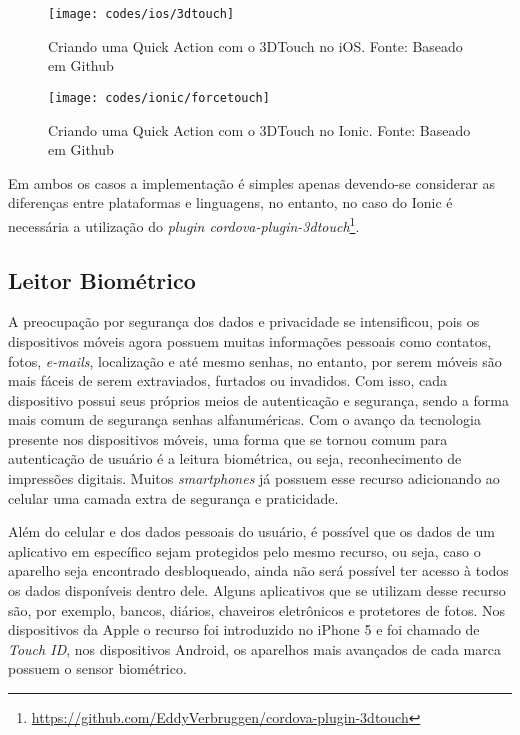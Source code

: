\begin{figure}[H]
	\centering
	\texttt{[image: codes/ios/3dtouch]}
	\caption[Criando uma Quick Action com o 3DTouch no iOS.]{Criando uma Quick Action com o 3DTouch no iOS. Fonte: Baseado em Github\protect\footnotemark}
	\label{fig:3dtouch-ios}
\end{figure}
\begin{figure}[H]
	\centering
	\texttt{[image: codes/ionic/forcetouch]}
	\caption[Criando uma Quick Action com o 3DTouch no Ionic]{Criando uma Quick Action com o 3DTouch no Ionic. Fonte: Baseado em Github\protect\footnotemark}
	\label{fig:forcetouch-ionic}
\end{figure}

Em ambos os casos a implementação é simples apenas devendo-se considerar as diferenças entre plataformas e linguagens, no entanto, no caso do Ionic é necessária a utilização do 
\textit{plugin cordova-plugin-3dtouch}\footnote{\url{https://github.com/EddyVerbruggen/cordova-plugin-3dtouch}}. 

\subsection{Leitor Biométrico} \label{subsec:biometrico}
A preocupação por segurança dos dados e privacidade se intensificou, pois os dispositivos móveis agora possuem muitas informações pessoais como contatos, fotos, \textit{e-mails}, localização e até mesmo senhas, no entanto,
por serem móveis são mais fáceis de serem extraviados, furtados ou invadidos. Com isso, cada dispositivo possui seus próprios meios de autenticação e segurança, sendo a forma mais comum de segurança senhas alfanuméricas. 
Com o avanço da tecnologia presente nos dispositivos móveis, uma forma que se tornou comum para autenticação de usuário é a leitura biométrica, ou seja, reconhecimento de impressões digitais. Muitos \textit{smartphones} 
já possuem esse recurso adicionando ao celular uma camada extra de segurança e praticidade. 

Além do celular e dos dados pessoais do usuário, é possível que os dados de um aplicativo em específico sejam protegidos pelo mesmo recurso, ou seja, caso o aparelho seja encontrado desbloqueado, ainda não será possível 
ter acesso à todos os dados disponíveis dentro dele. Alguns aplicativos que se utilizam desse recurso são, por exemplo, bancos, diários, chaveiros eletrônicos e protetores de fotos. Nos dispositivos da Apple o recurso 
foi introduzido no iPhone 5 e foi chamado de \textit{Touch ID}, nos dispositivos Android, os aparelhos mais avançados de cada marca possuem o sensor biométrico. 

